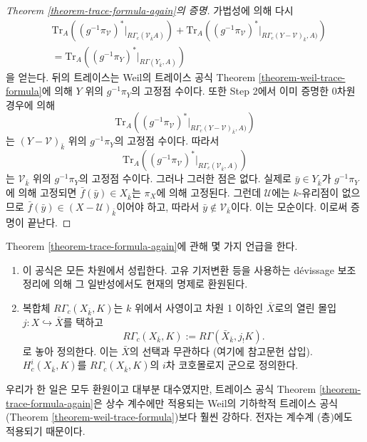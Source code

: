 \begin{proof}[Theorem \ref{theorem-trace-formula-again}의 증명]
\medskip\noindent
가법성에 의해 다시
\begin{eqnarray*}
& \text{Tr}_A((g^{-1}\pi_\mathcal{V})^* |_{R\Gamma_c(\mathcal{V}_{\bar k} A)})
+
\text{Tr}_A((g^{-1}\pi_\mathcal{V})^*
|_{R\Gamma_c(Y-\mathcal {V})_{\bar k}, A)}) \\
& =
\text{Tr}_A((g^{-1}\pi_Y)^* |_{R\Gamma(Y_{\bar k}, A)})
\end{eqnarray*}
을 얻는다. 뒤의 트레이스는 Weil의 트레이스 공식
Theorem \ref{theorem-weil-trace-formula}에 의해 $Y$ 위의
$g^{-1}\pi_Y$의 고정점 수이다. 또한 Step 2에서 이미 증명한
0차원 경우에 의해
$$
\text{Tr}_A((g^{-1}\pi_\mathcal{V})^*|_{R\Gamma_c(Y-\mathcal{V})_{\bar k}, A)})
$$
는 $(Y-\mathcal{V})_{\bar k}$ 위의 $g^{-1}\pi_Y$의 고정점 수이다.
따라서
$$
\text{Tr}_A((g^{-1}\pi_\mathcal{V})^* |_{R\Gamma_c(\mathcal{V}_{\bar k}, A)})
$$
는 $\mathcal{V}_{\bar k}$ 위의 $g^{-1}\pi_Y$의 고정점 수이다.
그러나 그러한 점은 없다. 실제로
$\bar y\in Y_{\bar k}$가 $g^{-1}\pi_Y$에 의해 고정되면
$\bar f(\bar y) \in X_{\bar k}$는 $\pi_X$에 의해 고정된다.
그런데 $\mathcal{U}$에는 $k$-유리점이 없으므로
$\bar f(\bar y)\in (X-\mathcal{U})_{\bar k}$이어야 하고, 따라서
$\bar y\notin \mathcal{V}_{\bar k}$이다. 이는 모순이다.
이로써 증명이 끝난다.
\end{proof}

\begin{remark}
\label{remark-on-trace-formula-again}
Theorem \ref{theorem-trace-formula-again}에 관해 몇 가지 언급을 한다.
\begin{enumerate}
\item
이 공식은 모든 차원에서 성립한다. 고유 기저변환 등을 사용하는
d\'evissage 보조정리에 의해 그 일반성에서도 현재의 명제로 환원된다.
\item
복합체 $R\Gamma_c(X_{\bar k}, K)$는 $k$ 위에서 사영이고 차원 1
이하인 $\bar X$로의 열린 몰입 $j : X \hookrightarrow \bar X$를
택하고
$$
R\Gamma_c(X_{\bar k}, K) := R\Gamma(\bar X_{\bar k}, j_!K).
$$
로 놓아 정의한다. 이는 $\bar X$의 선택과 무관하다
(여기에 참고문헌 삽입). $H^i_c(X_{\bar k}, K)$를
$R\Gamma_c(X_{\bar k}, K)$의 $i$차 코호몰로지 군으로 정의한다.
\end{enumerate}
\end{remark}

\begin{remark}
\label{remark-stronger}
우리가 한 일은 모두 환원이고 대부분 대수였지만, 트레이스 공식
Theorem \ref{theorem-trace-formula-again}은 상수 계수에만 적용되는
Weil의 기하학적 트레이스 공식(Theorem
\ref{theorem-weil-trace-formula})보다 훨씬 강하다. 전자는 계수계
(층)에도 적용되기 때문이다.
\end{remark}


